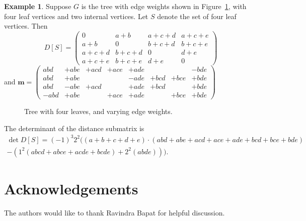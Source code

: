 \documentclass{amsart}
\theoremstyle{definition}
\newtheorem{eg}[thm]{Example}
\newcommand{\boldm}{\mathbf{m}}
\begin{document}
\begin{eg}
Suppose $G$ is the tree with edge weights shown in Figure~\ref{fig:tree-4}, with four leaf vertices and two internal vertices.
Let $S$ denote the set of four leaf vertices.
Then
\[
	D[S] = \begin{pmatrix}
	0 & a + b & a + c + d & a + c + e \\
	a + b & 0 & b + c + d & b + c + e \\
	a + c + d & b + c + d & 0 & d + e \\
	a + c + e & b + c + e & d + e & 0
	\end{pmatrix}
\]
and 
$\boldm = 
\begin{pmatrix}
abd & + abe & + acd & + ace & + ade & & & - bde \\
abd & + abe & & &  - ade & + bcd & + bce & + bde \\
abd & - abe & + acd & & + ade & + bcd & & + bde \\
-abd & + abe & & + ace & + ade & & + bce & + bde
\end{pmatrix}
$
\begin{figure}[h]
\centering
{}
\caption{Tree with four leaves, and varying edge weights.}
\label{fig:tree-4}
\end{figure}
The determinant of the distance submatrix is
\[
	\begin{gathered}
	\det D[S] 
	= (-1)^3 2^2 \Big( (a + b + c + d + e) \cdot (abd + abe + acd + ace + ade + bcd + bce + bde) \\
	- (1^2(abcd + abce + acde + bcde) + 2^2 (abde)) \Big).
	\end{gathered}
\]
\end{eg}


\section*{Acknowledgements}
The authors would like to thank Ravindra Bapat for helpful discussion.


 

\end{document}
